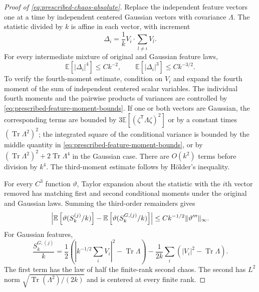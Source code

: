 \documentclass[11pt,reqno]{amsart}
\numberwithin{equation}{section}
\theoremstyle{plain}
\theoremstyle{definition}
\DeclarePairedDelimiter{\norm}{\lVert}{\rVert}
\newcommand{\E}{\mathbb E}
\newcommand{\Tr}{\operatorname{Tr}}
\begin{document}
\begin{proof}[Proof of \eqref{eq:prescribed-chaos-absolute}]
Replace the independent feature vectors one at a time by independent centered Gaussian vectors with covariance $\Lambda$.  The statistic divided by $k$ is affine in each vector, with increment
\begin{equation}
 \Delta_i
 =\frac1kV_i\cdot\sum_{l\neq i}V_l.
 \label{eq:prescribed-Lindeberg-increment}
\end{equation}
For every intermediate mixture of original and Gaussian feature laws,
\begin{equation}
 \E[|\Delta_i|^4]\leq Ck^{-2},
 \qquad
 \E[|\Delta_i|^3]\leq Ck^{-3/2}.
 \label{eq:prescribed-Lindeberg-increment-moments}
\end{equation}
To verify the fourth-moment estimate, condition on $V_i$ and expand the fourth moment of the sum of independent centered scalar variables.  The individual fourth moments and the pairwise products of variances are controlled by \eqref{eq:prescribed-feature-moment-bounds}.  If one or both vectors are Gaussian, the corresponding terms are bounded by $3\E[(\zeta^{\mathsf T}\Lambda\zeta)^2]$ or by a constant times $(\Tr\Lambda^2)^2$; the integrated square of the conditional variance is bounded by the middle quantity in \eqref{eq:prescribed-feature-moment-bounds}, or by $(\Tr\Lambda^2)^2+2\Tr\Lambda^4$ in the Gaussian case.  There are $O(k^2)$ terms before division by $k^4$.  The third-moment estimate follows by H\"older's inequality.

For every $C^3$ function $\vartheta$, Taylor expansion about the statistic with the $i$th vector removed has matching first and second conditional moments under the original and Gaussian laws.  Summing the third-order remainders gives
\begin{equation}
 \left|\E\left[\vartheta(S_k^{(j)}/k)\right]
 -\E\left[\vartheta(S_k^{G,(j)}/k)\right]\right|
 \leq Ck^{-1/2}\norm{\vartheta'''}_\infty.
 \label{eq:prescribed-smooth-replacement}
\end{equation}
For Gaussian features,
\begin{equation}
 \frac{S_k^{G,(j)}}k
 =\frac12\left(\left|k^{-1/2}\sum_iV_i\right|^2-\Tr\Lambda\right)
 -\frac1{2k}\sum_i\left(|V_i|^2-\Tr\Lambda\right).
 \label{eq:prescribed-Gaussian-diagonal}
\end{equation}
The first term has the law of half the finite-rank second chaos.  The second has $L^2$ norm $\sqrt{\Tr(\Lambda^2)/(2k)}$ and is centered at every finite rank.


\end{proof}
\end{document}
